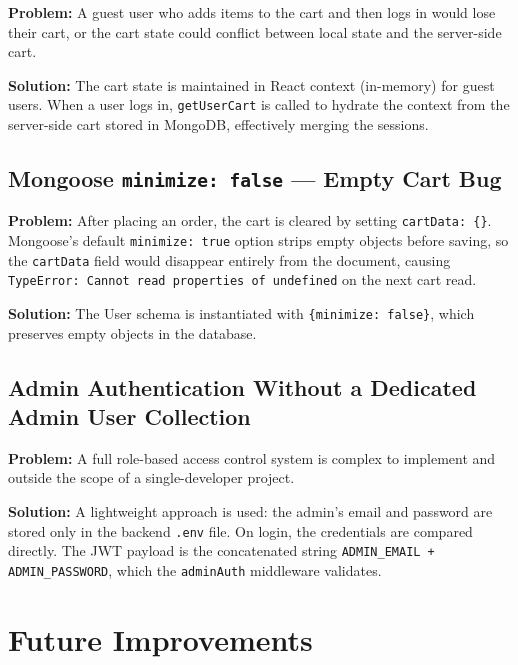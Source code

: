 \documentclass[12pt,a4paper]{report}
\begin{document}
\textbf{Problem:} A guest user who adds items to the cart and then logs in would lose their
cart, or the cart state could conflict between local state and the server-side cart.

\textbf{Solution:} The cart state is maintained in React context (in-memory) for guest users.
When a user logs in, \texttt{getUserCart} is called to hydrate the context from the
server-side cart stored in MongoDB, effectively merging the sessions.

\section{Mongoose \texttt{minimize: false} — Empty Cart Bug}

\textbf{Problem:} After placing an order, the cart is cleared by setting
\texttt{cartData: \{\}}.
Mongoose's default \texttt{minimize: true} option strips empty objects before saving,
so the \texttt{cartData} field would disappear entirely from the document, causing
\texttt{TypeError: Cannot read properties of undefined} on the next cart read.

\textbf{Solution:} The User schema is instantiated with \texttt{\{minimize: false\}},
which preserves empty objects in the database.

\section{Admin Authentication Without a Dedicated Admin User Collection}

\textbf{Problem:} A full role-based access control system is complex to implement and
outside the scope of a single-developer project.

\textbf{Solution:} A lightweight approach is used: the admin's email and password are
stored only in the backend \texttt{.env} file.
On login, the credentials are compared directly.
The JWT payload is the concatenated string \texttt{ADMIN\_EMAIL + ADMIN\_PASSWORD},
which the \texttt{adminAuth} middleware validates.

\chapter{Future Improvements}
\end{document}
